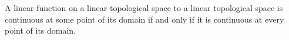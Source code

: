 A linear function on a linear topological space to a linear topological space is continuous at some point of its domain if and only if it is continuous at every point of its domain.
